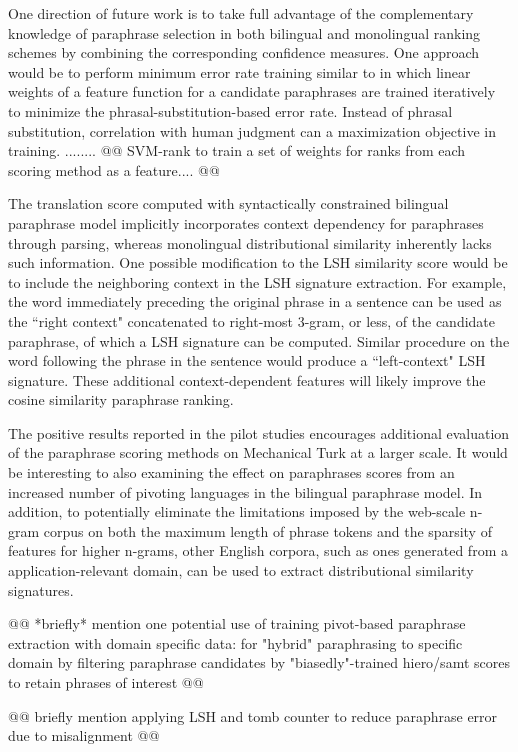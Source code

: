 \documentclass[11pt]{article}
\begin{document}
One direction of future work is to take full advantage of the complementary knowledge of paraphrase selection in both bilingual and monolingual ranking schemes by combining the corresponding confidence measures. One approach would be to perform minimum error rate training similar to  in which linear weights of a feature function for a candidate paraphrases are trained iteratively to minimize the phrasal-substitution-based error rate. Instead of phrasal substitution, correlation with human judgment can a maximization objective in training. ........ @@ SVM-rank to train a set of weights for ranks from each scoring method as a feature.... @@ 

The translation score computed with syntactically constrained bilingual paraphrase model implicitly incorporates context dependency for paraphrases through parsing, whereas monolingual distributional similarity inherently lacks such information. One possible modification to the LSH similarity score would be to include the neighboring context in the LSH signature extraction. For example, the word immediately preceding the original phrase in a sentence can be used as the ``right context" concatenated to right-most 3-gram, or less, of the candidate paraphrase, of which a LSH signature can be computed. Similar procedure on the word following the phrase in the sentence would produce a ``left-context" LSH signature. These additional context-dependent features will likely improve the cosine similarity paraphrase ranking.

The positive results reported in the pilot studies encourages additional evaluation of the paraphrase scoring methods on Mechanical Turk at a larger scale. It would be interesting to also examining the effect on paraphrases scores from an increased number of pivoting languages in the bilingual paraphrase model. In addition, to potentially eliminate the limitations imposed by the web-scale n-gram corpus on both the maximum length of phrase tokens and the sparsity of features for higher n-grams, other English corpora, such as ones generated from a application-relevant domain, can be used to extract distributional similarity signatures.

@@ *briefly* mention one potential use of training pivot-based paraphrase extraction with domain specific data: for "hybrid" paraphrasing to specific domain by filtering paraphrase candidates by "biasedly"-trained hiero/samt scores to retain phrases of interest @@

@@ briefly mention applying LSH and tomb counter to reduce paraphrase error due to misalignment @@
\end{document}
